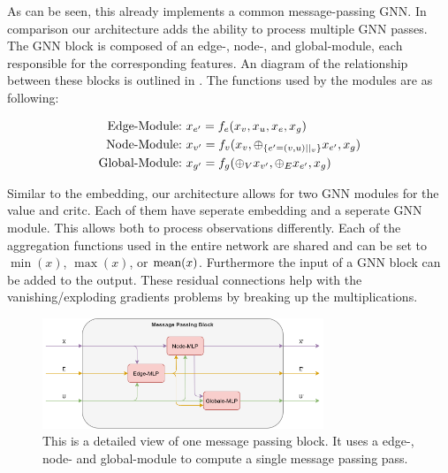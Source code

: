 As can be seen, this already implements a common message-passing GNN. In comparison our architecture adds the ability to process multiple GNN passes.
The GNN block is composed of an edge-, node-, and global-module, each responsible for the corresponding features. An diagram of the relationship between these blocks is outlined in . The functions used by the modules are as following:

\begin{equation}
    \begin{aligned}
        \textup{Edge-Module:}\ & x_{e'} = f_e(x_v, x_u, x_e, x_g)\\
        \textup{Node-Module:}\ & x_{v'} = f_v(x_v, \oplus_{\{e'=(v,u)||_v\}} x_{e'}, x_g)\\
        \textup{Global-Module:}\ & x_{g'} = f_g(\oplus_V x_{v'}, \oplus_E x_{e'}, x_g)
    \end{aligned}
    \nonumber
\end{equation}

Similar to the embedding, our architecture allows for two GNN modules for the value and critc. Each of them have seperate embedding and a seperate GNN module. This allows both to process observations differently. Each of the aggregation functions used in the entire network are shared and can be set to $\min(x)$, $\max(x)$, or $\textup{mean}(x)$. Furthermore the input of a GNN block can be added to the output. These residual connections help with the vanishing/exploding gradients problems by breaking up the multiplications.

\begin{figure}[htp]
    \centering
    \includegraphics[width=0.75\textwidth]{figures/message_passing_block.png}
    \hspace{1cm}   
    \caption{This is a detailed view of one message passing block. It uses a edge-, node- and global-module to compute a single message passing pass.}
    \label{fig:message_passing_block}
\end{figure}



